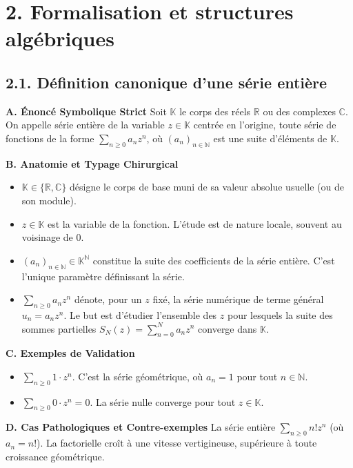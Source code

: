 \documentclass{report}
\begin{document}
\section*{2. Formalisation et structures algébriques}

\subsection*{2.1. Définition canonique d'une série entière}

\textbf{A. Énoncé Symbolique Strict}
Soit $\mathbb{K}$ le corps des réels $\mathbb{R}$ ou des complexes $\mathbb{C}$. On appelle série entière de la variable $z \in \mathbb{K}$ centrée en l'origine, toute série de fonctions de la forme $\sum_{n \geq 0} a_n z^n$, où $(a_n)_{n \in \mathbb{N}}$ est une suite d'éléments de $\mathbb{K}$.

\textbf{B. Anatomie et Typage Chirurgical}
\begin{itemize}
\item $\mathbb{K} \in \{\mathbb{R}, \mathbb{C}\}$ désigne le corps de base muni de sa valeur absolue usuelle (ou de son module).
\item $z \in \mathbb{K}$ est la variable de la fonction. L'étude est de nature locale, souvent au voisinage de $0$.
\item $(a_n)_{n \in \mathbb{N}} \in \mathbb{K}^{\mathbb{N}}$ constitue la suite des coefficients de la série entière. C'est l'unique paramètre définissant la série.
\item $\sum_{n \geq 0} a_n z^n$ dénote, pour un $z$ fixé, la série numérique de terme général $u_n = a_n z^n$. Le but est d'étudier l'ensemble des $z$ pour lesquels la suite des sommes partielles $S_N(z) = \sum_{n=0}^{N} a_n z^n$ converge dans $\mathbb{K}$.
\end{itemize}

\textbf{C. Exemples de Validation}
\begin{itemize}
\item $\sum_{n \geq 0} 1 \cdot z^n$. C'est la série géométrique, où $a_n = 1$ pour tout $n \in \mathbb{N}$.
\item $\sum_{n \geq 0} 0 \cdot z^n = 0$. La série nulle converge pour tout $z \in \mathbb{K}$.
\end{itemize}

\textbf{D. Cas Pathologiques et Contre-exemples}
La série entière $\sum_{n \geq 0} n! z^n$ (où $a_n = n!$). La factorielle croît à une vitesse vertigineuse, supérieure à toute croissance géométrique.
\end{document}
